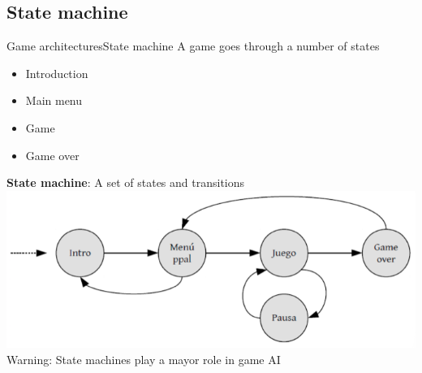 \documentclass[10pt,compress]{beamer} %
\begin{document}
\subsection{State machine}
\begin{frame}{Game architectures}{State machine}
	\vspace{-0.3cm}
	A game goes through a number of \alert{states}
		\begin{itemize}
			\item Introduction
			\item Main menu
			\item Game
			\item Game over
		\end{itemize}
	\textbf{State machine}: A set of states and transitions
	\vspace{0.3cm}
	\includegraphics[width=0.7\linewidth]{figs/states}\\
	\vspace{-0.2cm}
	Warning: State machines play a mayor role in game AI
\end{frame}
\end{document}
